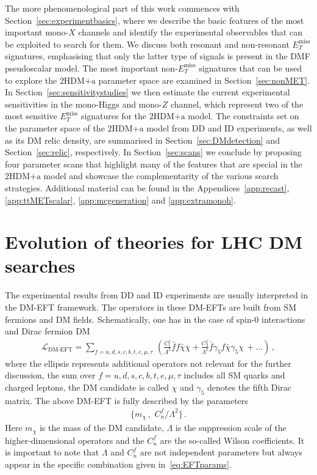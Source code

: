 \documentclass[a4paper, 11pt,notoc]{article}
\newcommand{\MET}{\ensuremath{E_T^\mathrm{miss}}\xspace}
\newcommand{\hdma}{\ensuremath{\textrm{2HDM+a}}\xspace}
\begin{document}
The more phenomenological part of this work commences with Section~\ref{sec:experimentbasics}, where we describe the basic features of the most important mono-$X$ channels and identify the experimental observables that can be exploited to search for them. We discuss both resonant and non-resonant $\MET$ signatures, emphasising that only the latter type of signals is present in the DMF pseudoscalar model. The most important non-$\MET$ signatures that can be used to explore the \hdma parameter space  are examined in Section~\ref{sec:nonMET}. In Section~\ref{sec:sensitivitystudies} we then estimate the current experimental sensitivities  in the mono-Higgs and mono-$Z$ channel, which represent two of the most sensitive $\MET$ signatures for the \hdma model. The constraints  set on the parameter space of the \hdma model from DD and ID experiments, as well as its DM relic density, are summarised in Section~\ref{sec:DMdetection} and Section~\ref{sec:relic}, respectively. In Section~\ref{sec:scans} we conclude by proposing four parameter scans that highlight many of the features that are special in the \hdma model and showcase the complementarity of the various search strategies.  Additional material can be found in the Appendices~\ref{app:recast}, \ref{app:ttMETscalar}, \ref{app:mcgeneration} and \ref{app:extramonoh}.


\section{Evolution of theories for LHC DM searches} 
\label{sec:evolution}

The experimental results from DD and ID experiments are usually interpreted in the DM-EFT framework. The operators in these DM-EFTs are built from SM fermions and DM fields. Schematically, one has in the case of spin-0 interactions and Dirac fermion DM
\begin{align}\label{eq:EFT}
\mathcal{L}_\text{DM-EFT}= \sum_{f=u,d,s,c,b,t,e,\mu,\tau} \,\left(\frac{C_{1}^f}{\Lambda^2} \bar f f \bar \chi \chi  +\frac{C_{2}^f}{\Lambda^2} \bar  f \gamma_5 f \bar \chi\gamma_5 \chi \,+\ldots \right) \,, 
\end{align}
 where the ellipsis represents additional operators not relevant for the further discussion, the sum over $f=u,d,s,c,b,t,e,\mu,\tau$ includes all SM quarks and charged leptons, the DM candidate is called $\chi$  and $\gamma_5$ denotes the fifth Dirac matrix. The above DM-EFT is fully described by the parameters
\begin{align}\label{eq:EFTparams}
\big\{ m_\chi\,,\,\, C_n^f/\Lambda^2 \big\} \,.
\end{align}
Here $m_\chi$ is the mass of the DM candidate, $\Lambda$ is the suppression scale of the higher-dimensional operators and the $C_n^f$ are the so-called Wilson coefficients. It is important to note that $\Lambda$ and $C_n^f$ are not independent parameters but always appear in the specific combination given in~\eqref{eq:EFTparams}. 
\end{document}
